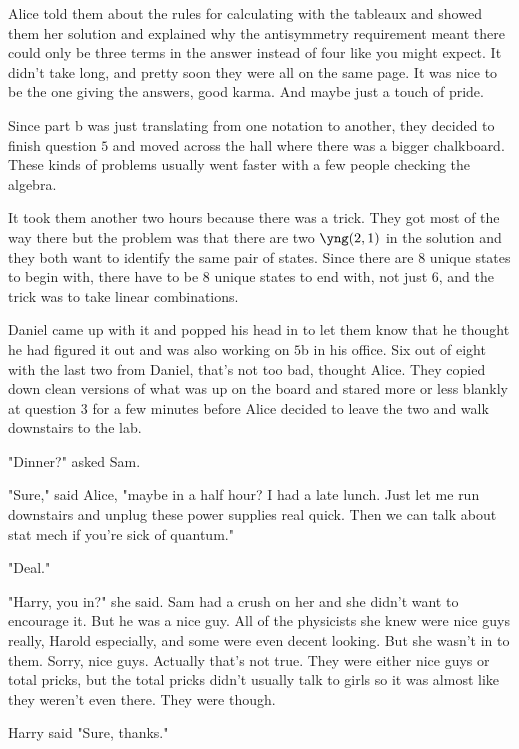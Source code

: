 \mypause

Alice told them about the rules for calculating with the tableaux and showed them her solution and explained why the antisymmetry requirement meant there could only be three terms in the answer instead of four like you might expect. It didn't take long, and pretty soon they were all on the same page. It was nice to be the one giving the answers, good karma. And maybe just a touch of pride.

Since part b was just translating from one notation to another, they decided to finish question $5$ and moved across the hall where there was a bigger chalkboard. These kinds of problems usually went faster with a few people checking the algebra. 

It took them another two hours because there was a trick. They got most of the way there but the problem was that there are two $\yng(2,1)$ in the solution and they both want to identify the same pair of states. Since there are 8 unique states to begin with, there have to be 8 unique states to end with, not just 6, and the trick was to take linear combinations.

Daniel came up with it and popped his head in to let them know that he thought he had figured it out and was also working on $5$b in his office. Six out of eight with the last two from Daniel, that's not too bad, thought Alice. They copied down clean versions of what was up on the board and stared more or less blankly at question 3 for a few minutes before Alice decided to leave the two and walk downstairs to the lab. 

"Dinner?" asked Sam. 

"Sure," said Alice, "maybe in a half hour? I had a late lunch. Just let me run downstairs and unplug these power supplies real quick. Then we can talk about stat mech if you're sick of quantum." 

"Deal." 

"Harry, you in?" she said. Sam had a crush on her and she didn't want to encourage it. But he was a nice guy. All of the physicists she knew were nice guys really, Harold especially, and some were even decent looking. But she wasn't in to them. Sorry, nice guys. Actually that's not true. They were either nice guys or total pricks, but the total pricks didn't usually talk to girls so it was almost like they weren't even there. They were though. 

Harry said "Sure, thanks." 

\mypause


